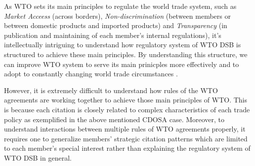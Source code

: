 As WTO sets its main principles to regulate the world trade system, 
such as \textit{Market Acceess} (across borders), 
\textit{Non-discrimination} (between members 
or between domestic products and imported products) 
and \textit{Transparency} (in publication and maintaining 
of each member's internal regulations), 
it's intellectually intriguing 
to understand how regulatory system of WTO DSB
is structured to achieve these main principles.
By understanding this structure, 
we can improve WTO system to serve its main prinicples more effectively 
and to adopt to constantly 
changing world trade circumstances
\citep{FREDEBEULKREIN1999625, shaffer_2004, 10.1093/jiel/jgm028}.

However, it is extremely difficult to 
understand how rules of the WTO agreements are
working together to achieve those main principles of WTO. 
This is because each citation is closely related 
to complex characteristics 
of each trade policy as exemplified in 
the above mentioned CDOSA case. 
Moreover, to understand interactions between multiple rules of WTO agreements properly, 
it requires one to generalize members' strategic 
citation patterns which are limited 
to each member's special interest 
rather than explaining the 
regulatory system of WTO DSB in general.


